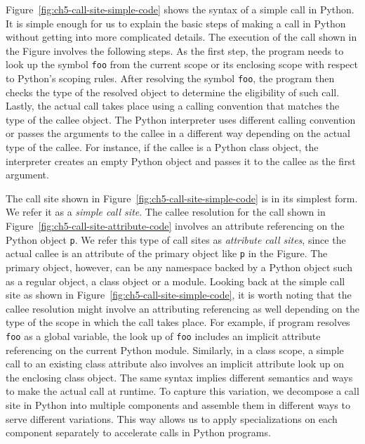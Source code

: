 Figure~\ref{fig:ch5-call-site-simple-code} shows the syntax of a simple call in Python.
It is simple enough for us to explain the basic steps of making a call in Python without getting into more complicated details.
The execution of the call shown in the Figure involves the following steps.
As the first step, the program needs to look up the symbol \texttt{foo} from the current scope or its enclosing scope with respect to Python's scoping rules.
After resolving the symbol \texttt{foo}, the program then checks the type of the resolved object to determine the eligibility of such call.
Lastly, the actual call takes place using a calling convention that matches the type of the callee object.
The Python interpreter uses different calling convention or passes the arguments to the callee in a different way depending on the actual type of the callee.
For instance, if the callee is a Python class object, the interpreter creates an empty Python object and passes it to the callee as the first argument.

The call site shown in Figure~\ref{fig:ch5-call-site-simple-code} is in its simplest form.
We refer it as a \emph{simple call site}.
The callee resolution for the call shown in Figure~\ref{fig:ch5-call-site-attribute-code} involves an attribute referencing on the Python object \texttt{p}.
We refer this type of call sites as \emph{attribute call sites}, since the actual callee is an attribute of the primary object like \texttt{p} in the Figure.
The primary object, however, can be any namespace backed by a Python object such as a regular object, a class object or a module.
Looking back at the simple call site as shown in Figure~\ref{fig:ch5-call-site-simple-code},
it is worth noting that the callee resolution might involve an attributing referencing as well depending on the type of the scope in which the call takes place.
For example, if program resolves \texttt{foo} as a global variable, the look up of \texttt{foo} includes an implicit attribute referencing on the current Python module.
Similarly, in a class scope, a simple call to an existing class attribute also involves an implicit attribute look up on the enclosing class object.
The same syntax implies different semantics and ways to make the actual call at runtime.
To capture this variation, we decompose a call site in Python into multiple components and assemble them in different ways to serve different variations.
This way allows us to apply specializations on each component separately to accelerate calls in Python programs.

